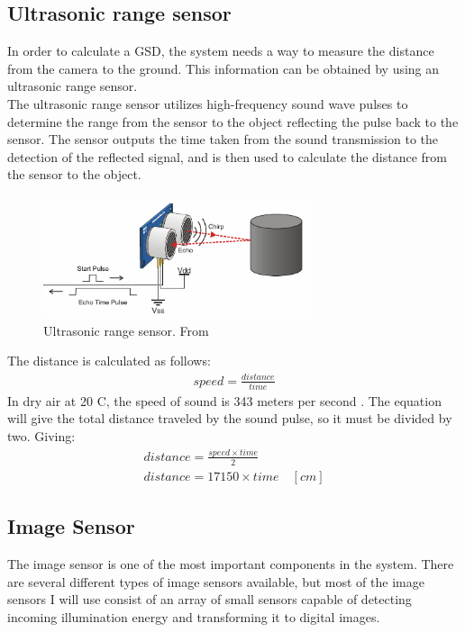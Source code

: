 \subsection{Ultrasonic range sensor}
\label{urs}
In order to calculate a GSD, the system needs a way to measure the distance from the camera to the ground. This information can be obtained by using an ultrasonic range sensor. \\

The ultrasonic range sensor utilizes high-frequency sound wave pulses to determine the range from the sensor to the object reflecting the pulse back to the sensor. The sensor outputs the time taken from the sound transmission to the detection of the reflected signal, and is then used to calculate the distance from the sensor to the object.\\

\begin{figure}[h]
  \centering
  \includegraphics[width=0.7\textwidth]{fig/dsensor}
  \caption{Ultrasonic range sensor. From \cite{maker}}
  \label{fig:dsensor}
\end{figure}

The distance is calculated as follows:
\begin{align}
	speed = \frac{distance}{time}
\end{align}
In dry air at 20 C, the speed of sound is 343 meters per second \cite{sos}. The equation will give the total distance traveled by the sound pulse, so it must be divided by two. Giving:
\begin{align*}
	distance = \frac{speed \times time}{2}\\
    distance = 17150 \times time \quad [cm] 
\end{align*}

\newpage

\subsection{Image Sensor}
The image sensor is one of the most important components in the system. There are several different types of image sensors available, but most of the image sensors I will use consist of an array of small sensors capable of detecting incoming illumination energy and transforming it to digital images.\\

